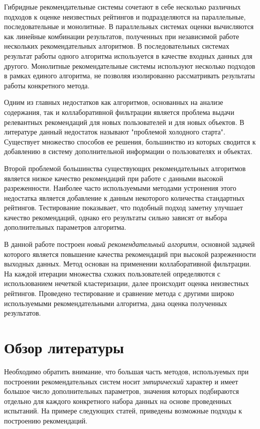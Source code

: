 \documentclass[12pt]{article} %
\begin{document}
\par
Гибридные рекомендательные системы сочетают в себе несколько различных подходов к оценке неизвестных рейтингов и подразделяются на параллельные, последовательные и монолитные. В параллельных системах оценки вычисляются как линейные комбинации результатов, полученных при независимой работе нескольких рекомендательных алгоритмов. В последовательных системах результат работы одного алгоритма используется в качестве входных данных для другого. Монолитные рекомендательные  системы используют несколько подходов в рамках единого алгоритма, не позволяя изолированно рассматривать результаты работы конкретного метода.

\par 
Одним из главных недостатков как алгоритмов, основанных на анализе содержания, так и коллаборативной фильтрации является проблема выдачи релевантных рекомендаций для новых пользователей и для новых объектов. В литературе данный недостаток называют "проблемой холодного старта"\cite{coldstart}. Существует множество способов ее решения, большинство из которых сводится к добавлению в систему дополнительной информации о пользователях и объектах.

\par
Второй проблемой большинства существующих рекомендательных алгоритмов является низкое качество рекомендаций при работе с данными высокой разреженности. Наиболее часто используемыми методами устронения этого недостатка является добавление к данным некоторого количества стандартных рейтингов\cite{empiricalanalysis}. Тестирование показывает, что подобный подход заметну улучшает качество рекомендаций, однако его результаты сильно зависят от выбора дополнительных параметров алгоритма.  

\par
В данной работе построен \textit{новый рекомендательный алгоритм}, основной задачей которого является повышение качества рекомендаций при высокой разреженности выходных данных. Метод основан на применении коллаборативной фильтрации. На каждой итерации множества схожих пользователей определяются с использованием нечеткой кластеризации, далее происходит оценка неизвестных рейтингов. Проведено тестирование и сравнение метода с другими широко используемыми рекомендательными алгоритма, дана оценка полученных результатов.


\section{Обзор литературы}
\par 
Необходимо обратить внимание, что большая часть методов, используемых при построении рекомендательных систем носит \textit{эмпирический }характер и имеет большое число дополнительных параметров, значения которых подбираются отдельно для каждого конкретного набора данных на основе проведенных испытаний. На примере следующих статей, приведены возможные подходы к построению рекомендаций.
\end{document}
